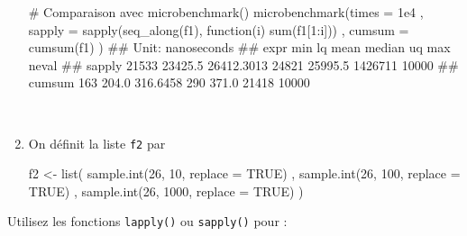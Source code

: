 \documentclass[12pt,]{article}
\newenvironment{Shaded}{}{}
\newcommand{\KeywordTok}[1]{\textcolor[rgb]{0.00,0.00,1.00}{{#1}}}
\newcommand{\DataTypeTok}[1]{{#1}}
\newcommand{\DecValTok}[1]{{#1}}
\newcommand{\FloatTok}[1]{{#1}}
\newcommand{\StringTok}[1]{\textcolor[rgb]{0.00,0.50,0.50}{{#1}}}
\newcommand{\CommentTok}[1]{\textcolor[rgb]{0.00,0.50,0.00}{{#1}}}
\newcommand{\OtherTok}[1]{\textcolor[rgb]{1.00,0.25,0.00}{{#1}}}
\newcommand{\NormalTok}[1]{{#1}}
\begin{document}
\begin{enumerate}
\begin{Shaded}
\begin{Highlighting}[]
\CommentTok{# Comparaison avec microbenchmark()}
\KeywordTok{microbenchmark}\NormalTok{(}\DataTypeTok{times =} \FloatTok{1e4}
  \NormalTok{, }\DataTypeTok{sapply =} \KeywordTok{sapply}\NormalTok{(}\KeywordTok{seq_along}\NormalTok{(f1), function(i) }\KeywordTok{sum}\NormalTok{(f1[}\DecValTok{1}\NormalTok{:i]))}
  \NormalTok{, }\DataTypeTok{cumsum =} \KeywordTok{cumsum}\NormalTok{(f1)}
\NormalTok{)}
\NormalTok{## Unit: nanoseconds}
\NormalTok{##    expr   min      lq       mean median      uq     max neval}
\NormalTok{##  sapply 21533 23425.5 26412.3013  24821 25995.5 1426711 10000}
\NormalTok{##  cumsum   163   204.0   316.6458    290   371.0   21418 10000}
\end{Highlighting}
\end{Shaded}

  ~
\item
  On définit la liste \texttt{f2} par

\begin{Shaded}
\begin{Highlighting}[]
\NormalTok{f2 <-}\StringTok{ }\KeywordTok{list}\NormalTok{(}
  \KeywordTok{sample.int}\NormalTok{(}\DecValTok{26}\NormalTok{, }\DecValTok{10}\NormalTok{, }\DataTypeTok{replace =} \OtherTok{TRUE}\NormalTok{)}
  \NormalTok{, }\KeywordTok{sample.int}\NormalTok{(}\DecValTok{26}\NormalTok{, }\DecValTok{100}\NormalTok{, }\DataTypeTok{replace =} \OtherTok{TRUE}\NormalTok{)}
  \NormalTok{, }\KeywordTok{sample.int}\NormalTok{(}\DecValTok{26}\NormalTok{, }\DecValTok{1000}\NormalTok{, }\DataTypeTok{replace =} \OtherTok{TRUE}\NormalTok{)}
\NormalTok{)}
\end{Highlighting}
\end{Shaded}
\end{enumerate}

Utilisez les fonctions \texttt{lapply()} ou \texttt{sapply()} pour :
\end{document}
